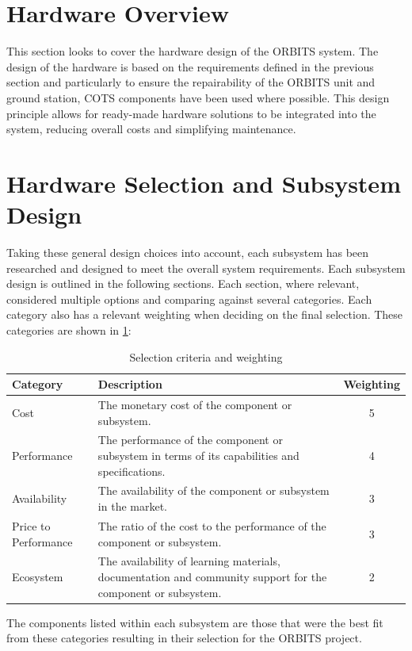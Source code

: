 \documentclass[a4paper,12pt,titlepage]{report}
\begin{document}
\section{Hardware Overview}
This section looks to cover the hardware design of the ORBITS system. The design of the hardware is based on the requirements defined in the previous section and particularly to ensure the repairability of the ORBITS unit and ground station, COTS components have been used where possible. This design principle allows for ready-made hardware solutions to be integrated into the system, reducing overall costs and simplifying maintenance.

\section{Hardware Selection and Subsystem Design}
Taking these general design choices into account, each subsystem has been researched and designed to meet the overall system requirements. Each subsystem design is outlined in the following sections. Each section, where relevant, considered multiple options and comparing against several categories. Each category also has a relevant weighting when deciding on the final selection. These categories are shown in \ref{tab:selection_criteria_weighting}:
\begin{table}[h]
\centering
\caption{Selection criteria and weighting}
\label{tab:selection_criteria_weighting}
\begin{tabular}{|p{4cm}|p{8cm}|c|}
\hline
\textbf{Category} & \textbf{Description} & \textbf{Weighting} \\ \hline
Cost & The monetary cost of the component or subsystem. & 5 \\ \hline
Performance & The performance of the component or subsystem in terms of its capabilities and specifications. & 4 \\ \hline
Availability & The availability of the component or subsystem in the market. & 3 \\ \hline
Price to Performance & The ratio of the cost to the performance of the component or subsystem. & 3 \\ \hline
Ecosystem & The availability of learning materials, documentation and community support for the component or subsystem. & 2 \\ \hline
\end{tabular}
\end{table}

The components listed within each subsystem are those that were the best fit from these categories resulting in their selection for the ORBITS project.
\end{document}
